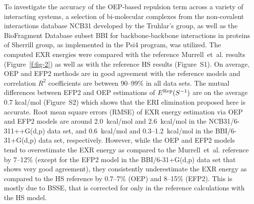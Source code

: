 \documentclass[aip,jcp,amsmath,amssymb,preprint,floatfix]{revtex4-1}
\begin{document}
To investigate the accuracy of the OEP\hyp{}based repulsion
term across
a variety of
interacting systems, a selection of
bi\hyp{}molecular complexes from the non\hyp{}covalent
interactions database NCB31 developed by the Truhlar's 
group,\cite{Zhao.Schultz.Truhlar.JCTC.2006,
Zhao.Truhlar.JCTC.2005,Zhao.Schultz.Truhlar.JCTC.2006,Zhao.Schultz.Truhlar.JCP.2005}
as well as the BioFragment Database subset BBI for backbone\hyp{}backbone
interactions in proteins of Sherrill group,\cite{Burns.Faver.Zheng.Marshall.Smith.Vanommeslaeghe.MacKerell.Merz.Sherrill.JCP.2017} 
as implemented in the {\sc Psi4}
program,\cite{Psi4.JCTC.2017}
was utilized. The computed
EXR energies were compared with the reference Murrell~et~al. results (Figure~\ref{f:fig-2})
as well as with the reference HS results (Figure~S1).
On average, OEP and EFP2 methods are in good agreement
with the reference models and correlation $R^2$ coefficients
are between 90--99\% in all data sets. 
The mutual differences between EFP2 and OEP estimations of 
$E^{\rm Rep}(S^{-1})$ are on the average 0.7 kcal/mol  (Figure~S2) which shows that the ERI elimination proposed here is accurate.
Root mean square errors (RMSE) of EXR energy estimation
via OEP and EFP2 models
are around 2.0~kcal/mol and 2.6~kcal/mol in the NCB31/6-311++G(d,p) data set, and 0.6~kcal/mol 
and 0.3--1.2~kcal/mol
in the BBI/6-31+G(d,p) data set, respectively. However,
while the OEP and EFP2 models tend to overestimate
the EXR energy as compared to the Murrell~et~al. reference
by 7--12\%
(except for the EFP2 model in the BBI/6-31+G(d,p) data set that shows very good agreement), 
they consistently underestimate the EXR energy
as compared to the HS reference by 0.7--7\% (OEP)
and 8--15\% (EFP2).
This is mostly due to BSSE, that is corrected for
only in the reference calculations with the HS model.
%
%
%
%
\end{document}
